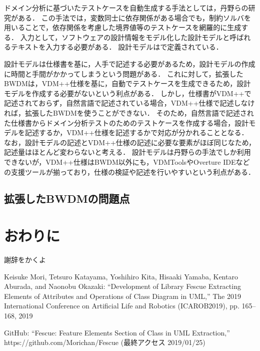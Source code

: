 \documentclass[uplatex, report, a4j, 10pt]{jsbook}
\newcommand{\tool}{BWDM}
\begin{document}
ドメイン分析に基づいたテストケースを自動生成する手法としては，丹野らの研究\cite{sekkeiModel}がある．
この手法では，変数同士に依存関係がある場合でも，制約ソルバ\cite{sat}を用いることで，依存関係を考慮した境界値等のテストケースを網羅的に生成する．
入力として，ソフトウェアの設計情報をモデル化した設計モデルと呼ばれるテキストを入力する必要がある．
設計モデルは\cite{sekkeiModel}で定義されている．

設計モデルは仕様書を基に，人手で記述する必要があるため，設計モデルの作成に時間と手間がかかってしまうという問題がある．
これに対して，拡張したBWDMは，VDM++仕様を基に，自動でテストケースを生成できるため，設計モデルを作成する必要がないという利点がある．
しかし，仕様書がVDM++で記述されておらず，自然言語で記述されている場合，VDM++仕様で記述しなければ，拡張したBWDMを使うことができない．
そのため，自然言語で記述された仕様書からドメイン分析テストのためのテストケースを作成する場合，設計モデルを記述するか，VDM++仕様を記述するかで対応が分かれることとなる．
なお，設計モデルの記述とVDM++仕様の記述に必要な要素がほぼ同じなため，記述量はほとんど変わらないと考える．
設計モデルは丹野らの手法でしか利用できないが，VDM++仕様はBWDM以外にも，VDMTools\cite{vdmtools}やOverture IDE\cite{overture}などの支援ツールが揃っており，仕様の検証や記述を行いやすいという利点がある．


\section{拡張した\tool{}の問題点}

\chapter{おわりに} \label{cha:Conclusion}

%
\acknowledgment{}

謝辞をかくよ


%
\begin{thebibliography}{99}
   Keisuke Mori, Tetsuro Katayama, Yoshihiro Kita, Hisaaki Yamaba, Kentaro Aburada, and Naonobu Okazaki: ``Development of Library Fescue Extracting Elements of Attributes and Operations of Class Diagram in UML,'' The 2019 International Conference on Artificial Life and Robotics (ICAROB2019), pp. 165--168, 2019

   GitHub: ``Fescue: Feature Elements Section of Class in UML Extraction,'' https://github.com/Morichan/Fescue (最終アクセス 2019/01/25)
\end{thebibliography}

%
\end{document}
